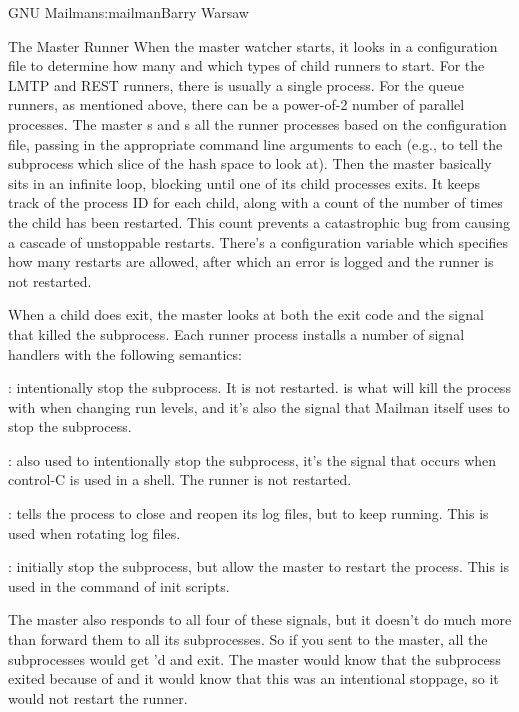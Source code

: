 \begin{aosachapter}{GNU Mailman}{s:mailman}{Barry Warsaw}
\begin{aosasect1}{The Master Runner}
When the master watcher starts, it looks in a configuration file to
determine how many and which types of child runners to start.  For the
LMTP and REST runners, there is usually a single process.  For the
queue runners, as mentioned above, there can be a power-of-2 number of
parallel processes.  The master s and s all
the runner processes based on the configuration file, passing in the
appropriate command line arguments to each (e.g., to tell the
subprocess which slice of the hash space to look at).  Then the master
basically sits in an infinite loop, blocking until one of its child
processes exits.  It keeps track of the process ID for each child,
along with a count of the number of times the child has been
restarted.  This count prevents a catastrophic bug from causing a
cascade of unstoppable restarts.  There's a configuration variable
which specifies how many restarts are allowed, after which an error is
logged and the runner is not restarted.

When a child does exit, the master looks at both the exit code and the
signal that killed the subprocess.  Each runner process installs a
number of signal handlers with the following semantics:

\begin{aosaitemize}

\item{}: intentionally stop the subprocess.  It is not
  restarted.   is what  will kill the process
  with when changing run levels, and it's also the signal that Mailman
  itself uses to stop the subprocess.

\item{}: also used to intentionally stop the subprocess,
  it's the signal that occurs when control-C is used in a shell.  The
  runner is not restarted.

\item{}: tells the process to close and reopen its log
  files, but to keep running.  This is used when rotating log files.

\item{}: initially stop the subprocess, but allow the
  master to restart the process.  This is used in the 
  command of init scripts.

\end{aosaitemize}

The master also responds to all four of these signals, but it doesn't
do much more than forward them to all its subprocesses.  So if you
sent  to the master, all the subprocesses would get
'd and exit.  The master would know that the subprocess
exited because of  and it would know that this was an
intentional stoppage, so it would not restart the runner.


\end{aosasect1}
\end{aosachapter}
